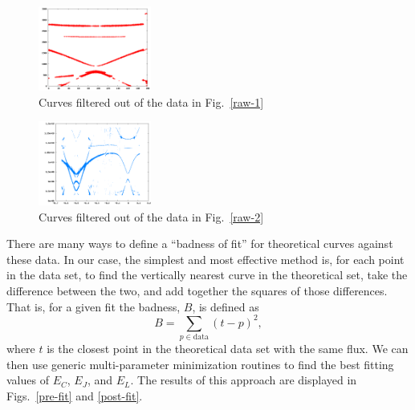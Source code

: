 \documentclass[twocolumn]{revtex4}
\newcommand{\figwidth}{0.33\textwidth}
\begin{document}
\begin{figure}
\includegraphics[width=\figwidth]{colorful-points.png}
\caption{ Curves filtered out of the data in Fig.~\ref{raw-1} }
\label{filter-1}
\end{figure}

\begin{figure}
\includegraphics[width=\figwidth]{CPBL-data.png}
\caption{ Curves filtered out of the data in Fig.~\ref{raw-2} }
\label{filter-2}
\end{figure}

There are many ways to define a ``badness of fit'' for theoretical
curves against these data. In our case, the simplest and most
effective method is, for each point in the data set, to find the
vertically nearest curve in the theoretical set, take the difference
between the two, and add together the squares of those
differences. That is, for a given fit the badness, $B$, is defined as
\begin{equation}
\label{badness}
B = \sum_{p \in \text{data}} (t-p)^2,
\end{equation}
where $t$ is the closest point in the theoretical data set with the
same flux. We can then use generic multi-parameter minimization
routines to find the best fitting values of $E_C$, $E_J$, and
$E_L$.\cite{Byrd}\cite{Zhu} The results of this approach are displayed
in Figs.~\ref{pre-fit} and \ref{post-fit}.
\end{document}
